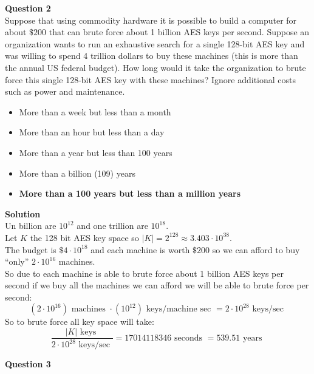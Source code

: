 \documentclass[a4paper,12pt]{article}
\begin{document}
\textbf{Question 2} \\

Suppose that using commodity hardware it is possible to build a computer for about $\$200$ that can brute force about 1 billion AES keys per second. Suppose an organization wants to run an exhaustive search for a single 128-bit AES key and was willing to spend 4 trillion dollars to buy these machines (this is more than the annual US federal budget). How long would it take the organization to brute force this single 128-bit AES key with these machines? Ignore additional costs such as power and maintenance.
%
\begin{itemize}
\item More than a week but less than a month
\item More than an hour but less than a day
\item More than a year but less than 100 years
\item More than a billion (109) years
\item \textbf{More than a 100 years but less than a million years}
\end{itemize}

\textbf{Solution} \\

Un billion are $10^{12}$ and one trillion are $10^{18}$.\\

Let $K$ the 128 bit AES key space so $|K| = 2^{128} \approx 3.403\cdot 10^{38}$.\\

The budget is $\$4 \cdot 10^{18}$ and each machine is worth $\$200$ so we can afford to buy ``only'' $2\cdot 10^{16}$ machines.\\

So due to each machine is able to brute force about 1 billion AES keys per second if we buy all the machines we can afford we will be able to brute force per second:
%
\begin{displaymath}
(2\cdot 10^{16})\textrm{ machines } \cdot (10^{12}) \textrm{ keys/machine sec } = 2\cdot 10^{28} \textrm{ keys/sec }   
\end{displaymath}
%
So to brute force all key space will take:
%
\begin{displaymath}
\frac{|K| \textrm{ keys }}{2\cdot 10^{28} \textrm{ keys/sec }} = 17014118346 \textrm{ seconds } = 539.51 \textrm{ years }   
\end{displaymath}

\textbf{Question 3} \\
\end{document}

